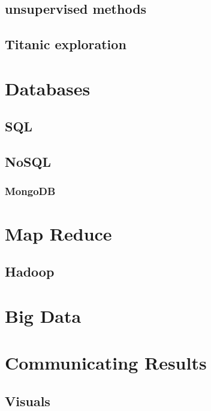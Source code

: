 \documentclass[10pt]{PhDthesisPSnPDF}%
\begin{document}
\section{unsupervised methods}

\section{Titanic exploration}


\chapter{Databases}\label{databases}
\section{SQL}
\section{NoSQL}
\subsection{MongoDB}
\chapter{Map Reduce}\label{mapR}
\section{Hadoop}
\chapter{Big Data}\label{bigData}
\chapter{Communicating Results}\label{Commun}
\section{Visuals}\label{Visuals}






\end{document}
